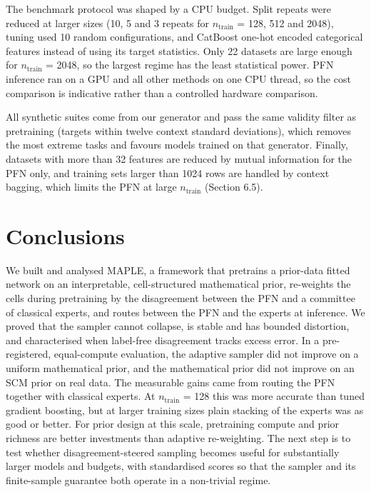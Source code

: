 \documentclass[mathematics,article,submit,pdftex,moreauthors]{Definitions/mdpi}
\begin{document}
The benchmark protocol was shaped by a CPU budget. Split repeats were reduced at larger sizes (10, 5 and 3 repeats for $n_{\mathrm{train}}$ = 128, 512 and 2048), tuning used 10 random configurations, and CatBoost one-hot encoded categorical features instead of using its target statistics. Only 22 datasets are large enough for $n_{\mathrm{train}}$ = 2048, so the largest regime has the least statistical power. PFN inference ran on a GPU and all other methods on one CPU thread, so the cost comparison is indicative rather than a controlled hardware comparison.

All synthetic suites come from our generator and pass the same validity filter as pretraining (targets within twelve context standard deviations), which removes the most extreme tasks and favours models trained on that generator. Finally, datasets with more than 32 features are reduced by mutual information for the PFN only, and training sets larger than 1024 rows are handled by context bagging, which limits the PFN at large $n_{\mathrm{train}}$ (Section 6.5).

\section{Conclusions}

We built and analysed MAPLE, a framework that pretrains a prior-data fitted network on an interpretable, cell-structured mathematical prior, re-weights the cells during pretraining by the disagreement between the PFN and a committee of classical experts, and routes between the PFN and the experts at inference. We proved that the sampler cannot collapse, is stable and has bounded distortion, and characterised when label-free disagreement tracks excess error. In a pre-registered, equal-compute evaluation, the adaptive sampler did not improve on a uniform mathematical prior, and the mathematical prior did not improve on an SCM prior on real data. The measurable gains came from routing the PFN together with classical experts. At $n_{\mathrm{train}}$ = 128 this was more accurate than tuned gradient boosting, but at larger training sizes plain stacking of the experts was as good or better. For prior design at this scale, pretraining compute and prior richness are better investments than adaptive re-weighting. The next step is to test whether disagreement-steered sampling becomes useful for substantially larger models and budgets, with standardised scores so that the sampler and its finite-sample guarantee both operate in a non-trivial regime.
\end{document}
